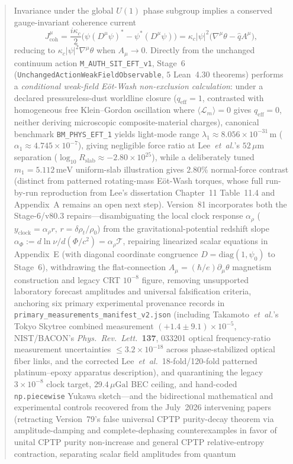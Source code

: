 \begin{abstract}
Invariance under the global $U(1)$ phase subgroup implies a conserved gauge-invariant coherence current
\begin{equation}
J^\mu_{\mathrm{coh}}
= \frac{i\kappa_c}{2}\bigl(\psi(D^\mu\psi)^* - \psi^*(D^\mu\psi)\bigr)
= \kappa_c |\psi|^2\bigl(\nabla^\mu\theta - \hat{q}A^\mu\bigr),
\label{eq:abstract_coherence_current}
\end{equation}
reducing to $\kappa_c|\psi|^2\nabla^\mu\theta$ when $A_\mu \to 0$. Directly from the unchanged continuum action \texttt{M\_AUTH\_SIT\_EFT\_v1}, Stage~6 (\texttt{UnchangedActionWeakFieldObservable}, $5$ Lean~4.30 theorems) performs a \emph{conditional weak-field E\"ot-Wash non-exclusion calculation}: under a declared pressureless-dust worldline closure ($q_{\mathrm{eff}} = 1$, contrasted with homogeneous free Klein--Gordon oscillation where $\langle\mathcal{L}_m\rangle = 0$ gives $q_{\mathrm{eff}} = 0$, neither deriving microscopic composite-material charges), canonical benchmark \texttt{BM\_PHYS\_EFT\_1} yields light-mode range $\lambda_1 \approx 8.056\times 10^{-31}\,\mathrm{m}$ ($\alpha_1 \approx 4.745\times 10^{-7}$), giving negligible force ratio at Lee~\emph{et~al.}'s $52\,\mu\mathrm{m}$ separation ($\log_{10} R_{\mathrm{slab}} \approx -2.80\times 10^{25}$), while a deliberately tuned $m_1 = 5.112\,\mathrm{meV}$ uniform-slab illustration gives $2.80\%$ normal-force contrast (distinct from patterned rotating-mass E\"ot-Wash torques, whose full run-by-run reproduction from Lee's dissertation Chapter~11 Table~11.4 and Appendix~A remains an open next step). Version~81 incorporates both the Stage-6/v80.3 repairs---disambiguating the local clock response $\alpha_\rho$ ($y_{\mathrm{clock}} = \alpha_\rho r$, $r = \delta\rho_t/\rho_0$) from the gravitational-potential redshift slope $\alpha_\Phi := d\ln\nu/d(\Phi/c^2) = \alpha_\rho\mathcal{T}$, repairing linearized scalar equations in Appendix~E (with diagonal coordinate congruence $D = \mathrm{diag}(1, \psi_0)$ to Stage~6), withdrawing the flat-connection $A_\mu = (\hbar/e)\partial_\mu\theta$ magnetism construction and legacy CRT $10^{-8}$ figure, removing unsupported laboratory forecast amplitudes and universal falsification criteria, anchoring six primary experimental provenance records in \texttt{primary\_measurements\_manifest\_v2.json} (including Takamoto~\emph{et~al.}'s Tokyo Skytree combined measurement $(+1.4 \pm 9.1)\times 10^{-5}$, NIST/BACON's \emph{Phys.\ Rev.\ Lett.}\ \textbf{137}, 033201 optical frequency-ratio measurement uncertainties $\le 3.2\times 10^{-18}$ across phase-stabilized optical fiber links, and the corrected Lee~\emph{et~al.}\ 18-fold/120-fold patterned platinum--epoxy apparatus description), and quarantining the legacy $3\times 10^{-8}$ clock target, $29.4\,\mu\mathrm{Gal}$ BEC ceiling, and hand-coded \texttt{np.piecewise} Yukawa sketch---and the bidirectional mathematical and experimental controls recovered from the July~2026 intervening papers (retracting Version~79's false universal CPTP purity-decay theorem via amplitude-damping and complete-dephasing counterexamples in favor of unital CPTP purity non-increase and general CPTP relative-entropy contraction, separating scalar field amplitudes from quantum 
\end{abstract}

